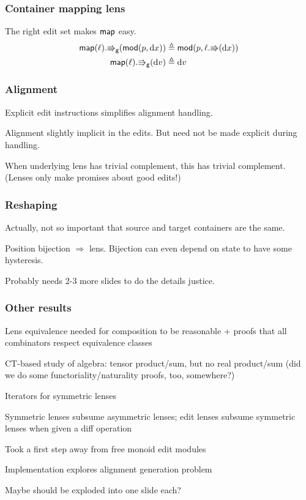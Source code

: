 \documentclass[table]{beamer}
\begin{document}
\begin{frame}
    \frametitle{Container mapping lens}
    The right edit set makes $\mathsf{map}$ easy.
    \begin{align*}
        \mathsf{map}(\ell).\mathord{\Rrightarrow}_{\mathsf{g}}(\mathsf{mod}(p,\textrm{d} x))
            &\triangleq \mathsf{mod}(p,\ell.\mathord{\Rrightarrow}(\textrm{d} x)) \\
        \mathsf{map}(\ell).\mathord{\Rrightarrow}_{\mathsf{g}}(\textrm{d} v) &\triangleq \textrm{d} v
    \end{align*}

\end{frame}

\begin{frame}
    \frametitle{Alignment}
    Explicit edit instructions simplifies alignment handling.

    Alignment slightly implicit in the edits. But need not be made explicit
    during handling.

    When underlying lens has trivial complement, this has trivial
    complement. (Lenses only make promises about good edits!)
\end{frame}

\begin{frame}
    \frametitle{Reshaping}
    Actually, not so important that source and target containers are the
    same.

    Position bijection $\Rightarrow$ lens. Bijection can even depend on
    state to have some hysteresis.

    Probably needs 2-3 more slides to do the details justice.
\end{frame}

\begin{frame}
    \frametitle{Other results}
    Lens equivalence needed for composition to be reasonable + proofs that
    all combinators respect equivalence classes

    CT-based study of algebra: tensor product/sum, but no real product/sum
    (did we do some functoriality/naturality proofs, too, somewhere?)

    Iterators for symmetric lenses

    Symmetric lenses subsume asymmetric lenses; edit lenses subsume
    symmetric lenses when given a diff operation

    Took a first step away from free monoid edit modules

    Implementation explores alignment generation problem

    Maybe should be exploded into one slide each?
\end{frame}

\end{document}
